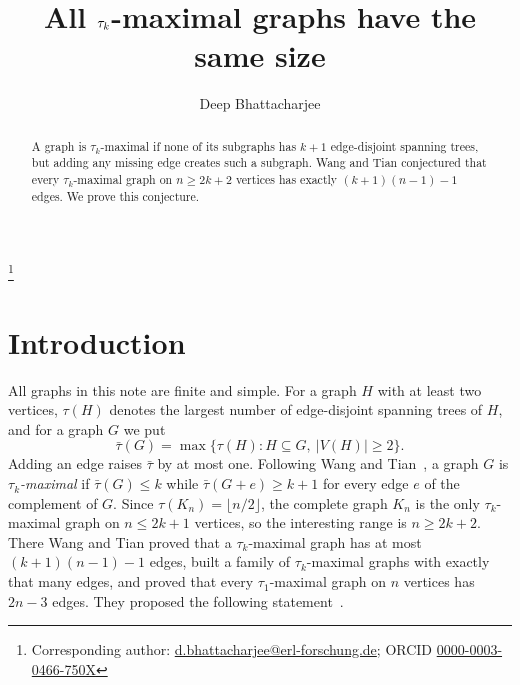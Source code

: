 \documentclass[11pt]{amsart}
\theoremstyle{definition}
\theoremstyle{remark}
\numberwithin{equation}{section}
\newcommand{\tb}{\bar\tau}
\begin{document}
\title[All \texorpdfstring{$\tau_{\lowercase{k}}$}{tau\_k}-maximal graphs have the same size]{All \texorpdfstring{$\tau_{\lowercase{k}}$}{tau\_k}-maximal graphs have the same size}

\author{Deep Bhattacharjee}
\address{Formerly, Electro-Gravitational Space Propulsion Laboratory (EGSPL),\newline Bhubaneswar, Odisha 751030, India}
\thanks{Corresponding author: \href{mailto:d.bhattacharjee@erl-forschung.de}{d.bhattacharjee@erl-forschung.de}; ORCID \href{https://orcid.org/0000-0003-0466-750X}{\mbox{0000-0003-0466-750X}}}


\begin{abstract}
A graph is $\tau_k$-maximal if none of its subgraphs has $k+1$ edge-disjoint spanning trees, but adding any missing edge creates such a subgraph. Wang and Tian conjectured that every $\tau_k$-maximal graph on $n\ge 2k+2$ vertices has exactly $(k+1)(n-1)-1$ edges. We prove this conjecture.
\end{abstract}

\maketitle

\section{Introduction}

All graphs in this note are finite and simple. For a graph $H$ with at least two vertices, $\tau(H)$ denotes the largest number of edge-disjoint spanning trees of $H$, and for a graph $G$ we put
\[
\tb(G)=\max\{\tau(H): H\subseteq G,\ |V(H)|\ge 2\}.
\]
Adding an edge raises $\tb$ by at most one. Following Wang and Tian~\cite{WT}, a graph $G$ is \emph{$\tau_k$-maximal} if $\tb(G)\le k$ while $\tb(G+e)\ge k+1$ for every edge $e$ of the complement of $G$. Since $\tau(K_n)=\lfloor n/2\rfloor$, the complete graph $K_n$ is the only $\tau_k$-maximal graph on $n\le 2k+1$ vertices, so the interesting range is $n\ge 2k+2$. There Wang and Tian proved that a $\tau_k$-maximal graph has at most $(k+1)(n-1)-1$ edges, built a family of $\tau_k$-maximal graphs with exactly that many edges, and proved that every $\tau_1$-maximal graph on $n$ vertices has $2n-3$ edges. They proposed the following statement~\cite[Conjecture~1]{WT}.
\end{document}
